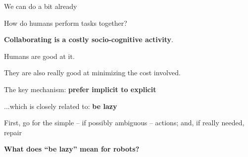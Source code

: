 \documentclass[xcolor=table]{beamer}
\begin{document}

{

\begin{frame}{We can do a bit already}

    \begin{center}
    \end{center}

\end{frame}

}


\begin{frame}{How do humans perform tasks together?}


    \begin{center}
        {\bf Collaborating is a costly socio-cognitive activity}.

    \pause
    Humans are good at it.
        
    They are also really good at minimizing the cost
    involved.
    \pause
    
        The key mechanism: {\bf prefer implicit to explicit}

    \pause

        ...which is closely related to: {\bf be lazy}
        
        First, go for the simple -- if possibly ambiguous -- actions; and, if
        really needed, repair

    \pause
    \vspace{2cm}
    {\bf What does ``be lazy'' mean for robots?}
    \end{center}
        
\end{frame}

\end{document}
